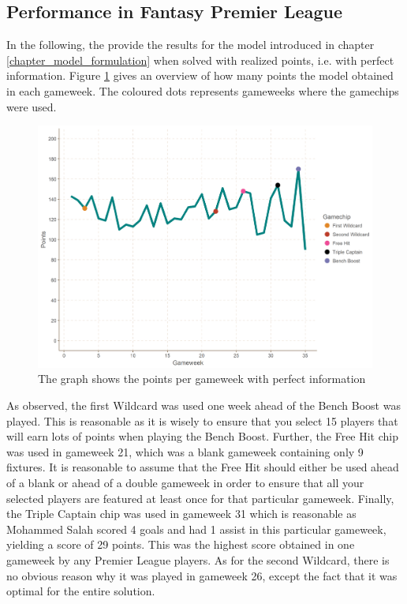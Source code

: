 \subsection{Performance in Fantasy Premier League}
In the following, the provide the results for the model introduced in chapter \ref{chapter_model_formulation} when solved with realized points, i.e. with perfect information. Figure \ref{Figure_Realized_points} gives an overview of how many points the model obtained in each gameweek. The coloured dots represents gameweeks where the gamechips were used. 

\begin{figure}[H]
    \centering
    \includegraphics[scale=0.5]{fig/chapter_7/perf_gc.png}
    \caption{The graph shows the points per gameweek with perfect information}
\label{Figure_Realized_points}    
\end{figure}

As observed, the first Wildcard was used one week ahead of the Bench Boost was played. This is reasonable as it is wisely to ensure that you select 15 players that will earn lots of points when playing the Bench Boost. Further, the Free Hit chip was used in gameweek 21, which was a blank gameweek containing only 9 fixtures. It is reasonable to assume that the Free Hit should either be used ahead of a blank or ahead of a double gameweek in order to ensure that all your selected players are featured at least once for that particular gameweek. Finally, the Triple Captain chip was used in gameweek 31 which is reasonable as Mohammed Salah scored 4 goals and had 1 assist in this particular gameweek, yielding a score of 29 points. This was the highest score obtained in one gameweek by any Premier League players. As for the second Wildcard, there is no obvious reason why it was played in gameweek 26, except the fact that it was optimal for the entire solution. 
\newpar


